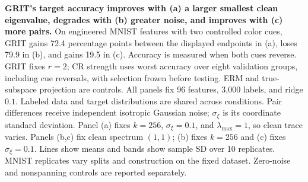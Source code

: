 \textbf{GRIT's target accuracy improves with (a) a larger smallest clean eigenvalue, degrades with (b) greater noise, and improves with (c) more pairs.} On engineered MNIST features with two controlled color cues, GRIT gains 72.4 percentage points between the displayed endpoints in (a), loses 79.9 in (b), and gains 19.5 in (c). Accuracy is measured when both cues reverse. GRIT fixes $r=2$; CR strength uses worst accuracy over eight validation groups, including cue reversals, with selection frozen before testing. ERM and true-subspace projection are controls. All panels fix 96 features, 3,000 labels, and ridge $0.1$. Labeled data and target distributions are shared across conditions. Pair differences receive independent isotropic Gaussian noise; $\sigma_\xi$ is its coordinate standard deviation. Panel (a) fixes $k=256$, $\sigma_\xi=0.1$, and $\lambda_{\max}=1$, so clean trace varies. Panels (b,c) fix clean spectrum $(1,1)$; (b) fixes $k=256$ and (c) fixes $\sigma_\xi=0.1$. Lines show means and bands show sample SD over 10 replicates. MNIST replicates vary splits and construction on the fixed dataset. Zero-noise and nonspanning controls are reported separately. 

